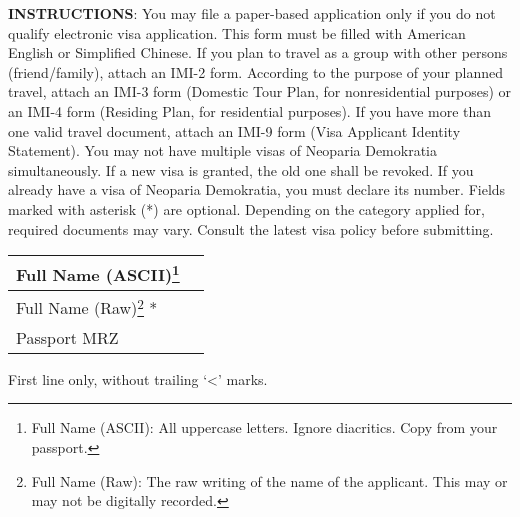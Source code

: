 




\begin{minipage}{\textwidth}
	\small
	\textbf{INSTRUCTIONS}:
	\inlinelistitem You may file a paper-based application only if you do not qualify electronic visa application.
	\inlinelistitem This form must be filled with American English or Simplified Chinese.
	\inlinelistitem If you plan to travel as a group with other persons (friend/family), attach an IMI-2 form.
	\inlinelistitem According to the purpose of your planned travel, attach an IMI-3 form (Domestic Tour Plan, for nonresidential purposes) or an IMI-4 form (Residing Plan, for residential purposes).
	\inlinelistitem If you have more than one valid travel document, attach an IMI-9 form (Visa Applicant Identity Statement).
	\inlinelistitem You may not have multiple visas of Neoparia Demokratia simultaneously. If a new visa is granted, the old one shall be revoked. If you already have a visa of Neoparia Demokratia, you must declare its number.
	\inlinelistitem Fields marked with asterisk (*) are optional.
	\inlinelistitem Depending on the category applied for, required documents may vary. Consult the latest visa policy before submitting.
\end{minipage}
\vskip 20pt



\begin{tabu}{|l|X|}
	\hline
	{\formfieldlead Full Name (ASCII)\footnote{Full Name (ASCII): All uppercase letters. Ignore diacritics. Copy from your passport.}}                                                                                                                     & {} \\
	\hline
	{\formfieldlead Full Name (Raw)\footnote{Full Name (Raw): The raw writing of the name of the applicant. This may or may not be digitally recorded.} *} & {} \\
	\hline
	{\formfieldlead Passport MRZ}                                                                                                                          & {} \\
	\hline
\end{tabu}
{\small First line only, without trailing `<' marks.}
\vskip 10pt


